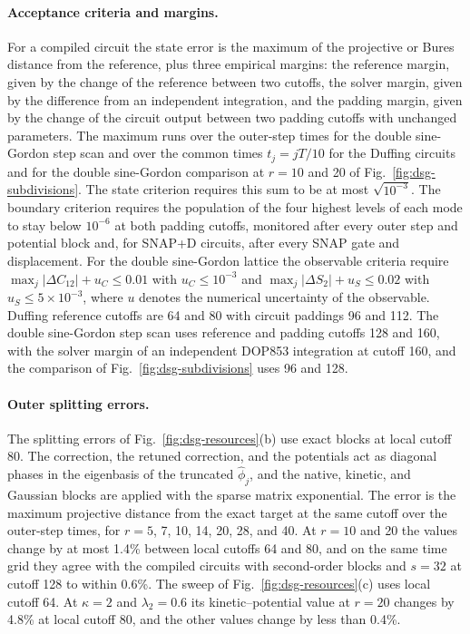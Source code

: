 \documentclass[pra,twocolumn,superscriptaddress,nofootinbib,floatfix]{revtex4-2}
\theoremstyle{remark}
\begin{document}
\paragraph{Acceptance criteria and margins.}
For a compiled circuit the state error is the maximum of the projective or Bures distance from the reference, plus three empirical margins: the reference margin, given by the change of the reference between two cutoffs, the solver margin, given by the difference from an independent integration, and the padding margin, given by the change of the circuit output between two padding cutoffs with unchanged parameters. The maximum runs over the outer-step times for the double sine-Gordon step scan and over the common times \(t_j=jT/10\) for the Duffing circuits and for the double sine-Gordon comparison at \(r=10\) and 20 of Fig.~\ref{fig:dsg-subdivisions}. The state criterion requires this sum to be at most \(\sqrt{10^{-3}}\). The boundary criterion requires the population of the four highest levels of each mode to stay below \(10^{-6}\) at both padding cutoffs, monitored after every outer step and potential block and, for SNAP+D circuits, after every SNAP gate and displacement. For the double sine-Gordon lattice the observable criteria require \(\max_j|\Delta C_{12}|+u_C\le0.01\) with \(u_C\le10^{-3}\) and \(\max_j|\Delta S_2|+u_S\le0.02\) with \(u_S\le5\times10^{-3}\), where \(u\) denotes the numerical uncertainty of the observable. Duffing reference cutoffs are 64 and 80 with circuit paddings 96 and 112. The double sine-Gordon step scan uses reference and padding cutoffs 128 and 160, with the solver margin of an independent DOP853 integration at cutoff 160, and the comparison of Fig.~\ref{fig:dsg-subdivisions} uses 96 and 128.

\paragraph{Outer splitting errors.}
The splitting errors of Fig.~\ref{fig:dsg-resources}(b) use exact blocks at local cutoff 80. The correction, the retuned correction, and the potentials act as diagonal phases in the eigenbasis of the truncated \(\hat\phi_j\), and the native, kinetic, and Gaussian blocks are applied with the sparse matrix exponential. The error is the maximum projective distance from the exact target at the same cutoff over the outer-step times, for \(r=5\), 7, 10, 14, 20, 28, and 40. At \(r=10\) and 20 the values change by at most 1.4\% between local cutoffs 64 and 80, and on the same time grid they agree with the compiled circuits with second-order blocks and \(s=32\) at cutoff 128 to within 0.6\%. The sweep of Fig.~\ref{fig:dsg-resources}(c) uses local cutoff 64. At \(\kappa=2\) and \(\lambda_2=0.6\) its kinetic--potential value at \(r=20\) changes by 4.8\% at local cutoff 80, and the other values change by less than 0.4\%.
\end{document}
